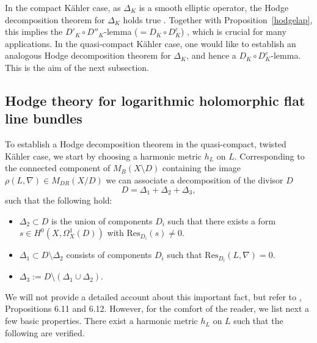 \documentclass[english]{amsart}
\newcommand{\Res}{\mathrm{Res}}
\numberwithin{equation}{thm}
\begin{document}
In the compact K\"ahler case, as $\Delta_K$ is a smooth elliptic operator, the Hodge decomposition theorem for $\Delta_K$ holds true \cite[Section 2]{Sim92}. Together with Proposition~\ref{hodgelap}, this implies the $D'_K\circ D''_K$-lemma ($= D_K \circ D^c _K$) \cite[Lemma 2.1]{Sim92}, which is crucial for many applications.
In the quasi-compact K\"ahler case, one would like to establish an analogous Hodge decomposition theorem for $\Delta_K$, and hence a $D_K \circ D^c _K$-lemma. This is the aim of the next subsection.


\subsection{Hodge theory for logarithmic holomorphic flat line bundles}\label{hodgeloc}

To establish a Hodge decomposition theorem in the quasi-compact, twisted Kähler case, we start by choosing a harmonic metric $h_L$ on $L$.
Corresponding to the connected component of $M_B(X\setminus D)$ containing the image $\rho(L,\nabla) \in M_{DR}(X/D)$ we can associate a decomposition of the divisor $D$ 
\begin{equation}\label{decomp}
	D = \Delta_1 + \Delta_2 + \Delta_3 ,
\end{equation}
such that the following hold:
\begin{itemize}
	\item $\Delta_2 \subset D$ is the union of components $D_i$ such that there exists a form
	$s \in H^0(X, \Omega_X^1(D))$ with $\Res_{D_i}(s) \neq 0$.
	
	\item $\Delta_1 \subset D \setminus \Delta_2$ consists of components $D_i$ such that
	$\Res_{D_i}(L,\nabla) = 0$.
	
	\item $\Delta_3 := D \setminus (\Delta_1 \cup \Delta_2)$.
\end{itemize}

We will not provide a detailed account about this important fact, but refer to \cite{CDHP}, Propositions 6.11 and 6.12. However, for the comfort of the reader, we list next a few basic properties. There exist a harmonic metric $h_L$ on $L$ such that the following are verified.
\end{document}
